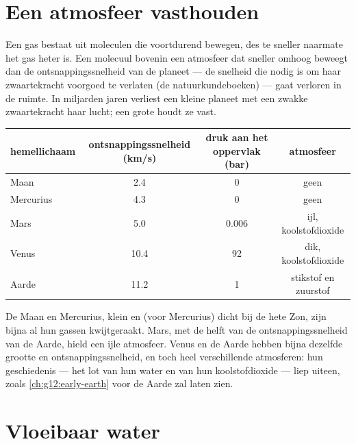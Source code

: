 \section{Een atmosfeer vasthouden}

Een gas bestaat uit moleculen die voortdurend bewegen, des te sneller naarmate
het gas heter is. Een molecuul bovenin een atmosfeer dat sneller omhoog beweegt
dan de ontsnappingssnelheid van de planeet --- de snelheid die nodig is om haar
zwaartekracht voorgoed te verlaten (de natuurkundeboeken) --- gaat verloren in
de ruimte. In miljarden jaren verliest een kleine planeet met een zwakke
zwaartekracht haar lucht; een grote houdt ze vast.

\begin{center}
\small
\begin{tabular}{lccc}
\hline
hemellichaam & ontsnappingssnelheid (\unit{km/s}) & druk aan het oppervlak (bar) & atmosfeer \\
\hline
Maan & 2.4 & 0 & geen \\
Mercurius & 4.3 & 0 & geen \\
Mars & 5.0 & 0.006 & ijl, koolstofdioxide \\
Venus & 10.4 & 92 & dik, koolstofdioxide \\
Aarde & 11.2 & 1 & stikstof en zuurstof \\
\hline
\end{tabular}
\end{center}

\begin{remark}\label{rem:g10:habitable-planet:size}
De Maan en Mercurius, klein en (voor Mercurius) dicht bij de hete Zon, zijn
bijna al hun gassen kwijtgeraakt. Mars, met de helft van de
ontsnappingssnelheid van de Aarde, hield een ijle atmosfeer. Venus en de Aarde
hebben bijna dezelfde grootte en ontsnappingssnelheid, en toch heel
verschillende atmosferen: hun geschiedenis --- het lot van hun water en van hun
koolstofdioxide --- liep uiteen, zoals \cref{ch:g12:early-earth} voor de Aarde
zal laten zien.
\end{remark}

\section{Vloeibaar water}

